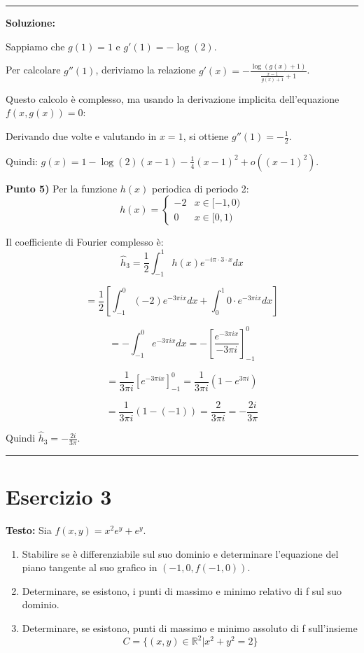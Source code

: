 \documentclass[12pt, a4paper]{article}
\newenvironment{solution}
{\par\noindent\rule{\textwidth}{0.4pt}\par\textbf{Soluzione:}\medskip\par}
{\par\rule{\textwidth}{0.4pt}\par\bigskip}
\begin{document}
\begin{solution}
Sappiamo che $g(1) = 1$ e $g'(1) = -\log(2)$.

Per calcolare $g''(1)$, deriviamo la relazione $g'(x) = -\frac{\log(g(x)+1)}{\frac{x-1}{g(x)+1} + 1}$.

Questo calcolo è complesso, ma usando la derivazione implicita dell'equazione $f(x,g(x)) = 0$:

Derivando due volte e valutando in $x = 1$, si ottiene $g''(1) = -\frac{1}{2}$.

Quindi: $g(x) = 1 - \log(2)(x-1) - \frac{1}{4}(x-1)^2 + o((x-1)^2)$.

\vspace{0.5cm}

\textbf{Punto 5)} Per la funzione $h(x)$ periodica di periodo 2:
\[
h(x) = \begin{cases} -2 & x \in [-1,0) \\ 0 & x \in [0,1) \end{cases}
\]

Il coefficiente di Fourier complesso è:
\[
\hat{h}_3 = \frac{1}{2} \int_{-1}^{1} h(x) e^{-i \pi \cdot 3 \cdot x} dx
\]

\[
= \frac{1}{2} \left[ \int_{-1}^{0} (-2) e^{-3\pi i x} dx + \int_{0}^{1} 0 \cdot e^{-3\pi i x} dx \right]
\]

\[
= -\int_{-1}^{0} e^{-3\pi i x} dx = -\left[ \frac{e^{-3\pi i x}}{-3\pi i} \right]_{-1}^{0}
\]

\[
= \frac{1}{3\pi i} \left[ e^{-3\pi i x} \right]_{-1}^{0} = \frac{1}{3\pi i} (1 - e^{3\pi i})
\]

\[
= \frac{1}{3\pi i} (1 - (-1)) = \frac{2}{3\pi i} = -\frac{2i}{3\pi}
\]

Quindi $\hat{h}_3 = -\frac{2i}{3\pi}$.
\end{solution}

\newpage

\section*{Esercizio 3}

\textbf{Testo:} Sia $f(x,y) = x^{2}e^{y} + e^{y}$.
\begin{enumerate}
    \item Stabilire se è differenziabile sul suo dominio e determinare l'equazione del piano tangente al suo grafico in $(-1,0,f(-1,0))$.
    \item Determinare, se esistono, i punti di massimo e minimo relativo di f sul suo dominio.
    \item Determinare, se esistono, punti di massimo e minimo assoluto di f sull'insieme
    \[ C = \{(x,y) \in \mathbb{R}^{2} | x^{2}+y^{2}=2\} \]
\end{enumerate}
\end{document}
